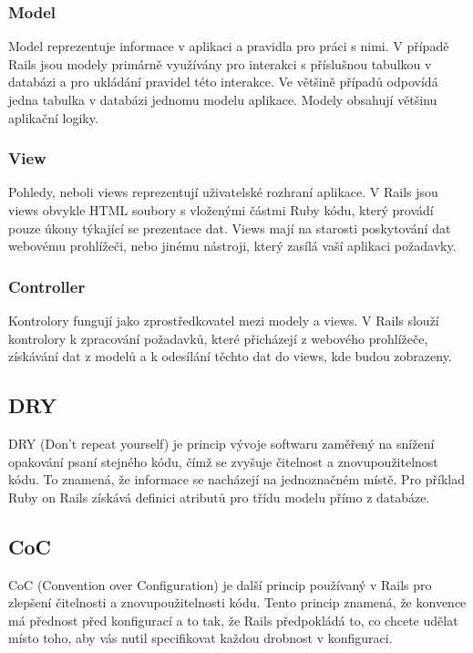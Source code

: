 \subsubsection{Model}
Model reprezentuje informace v aplikaci a pravidla pro práci s nimi. V případě Rails jsou modely primárně využívány pro interakci s příslušnou tabulkou v databázi a pro ukládání pravidel této interakce. Ve většině případů odpovídá jedna tabulka v databázi jednomu modelu aplikace. Modely obsahují většinu aplikační logiky.

\subsubsection{View}
Pohledy, neboli views reprezentují uživatelské rozhraní aplikace. V Rails jsou views obvykle HTML soubory s vloženými částmi Ruby kódu, který provádí pouze úkony týkající se prezentace dat. Views mají na starosti poskytování dat webovému prohlížeči, nebo jinému nástroji, který zasílá vaší aplikaci požadavky.

\subsubsection{Controller}
Kontrolory fungují jako zprostředkovatel mezi modely a views. V Rails slouží kontrolory k zpracování požadavků, které přicházejí z webového prohlížeče, získávání dat z modelů a k odesílání těchto dat do views, kde budou zobrazeny.

\subsection{DRY}
\label{dry}
DRY (Don’t repeat yourself) \cite{dry} je princip vývoje softwaru zaměřený na snížení opakování psaní stejného kódu, čímž se zvyšuje čitelnost a znovupoužitelnost kódu. To znamená, že informace se nacházejí na jednoznačném místě. Pro příklad Ruby on Rails získává definici atributů pro třídu modelu přímo z databáze.  

\subsection{CoC}
\label{coc}
CoC (Convention over Configuration) \cite{coc} je další princip používaný v Rails pro zlepšení čitelnosti a znovupoužitelnosti kódu. Tento princip znamená, že konvence má přednost před konfigurací a to tak, že Rails předpokládá to, co chcete udělat místo toho, aby vás nutil specifikovat každou drobnost v konfiguraci. 

